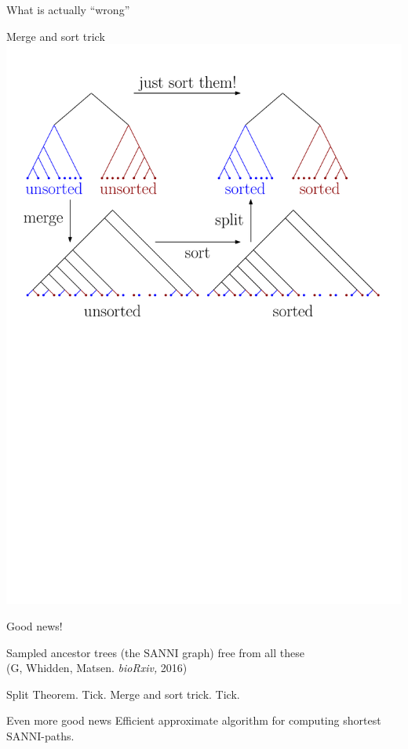 \documentclass{beamer}
\begin{document}
\begin{frame}{What is actually ``wrong''}
\begin{block}{Merge and sort trick}
\centering
\includegraphics[width=0.9\framewidth]{merge_and_sort_trick_solution}
\end{block}
\end{frame}

\begin{frame}{Good news!}
\begin{block}{Sampled ancestor trees (the $\mathrm{SANNI}$ graph) free from all these\\
(G, Whidden, Matsen. {\em bioRxiv,} 2016)}
\begin{outline}
\1 Split Theorem. Tick.
\1 Merge and sort trick. Tick.
\end{outline}
\end{block}

\pause

\begin{block}{Even more good news}
Efficient approximate algorithm for computing shortest $\mathrm{SANNI}$-paths.
\end{block}
\end{frame}
\end{document}

